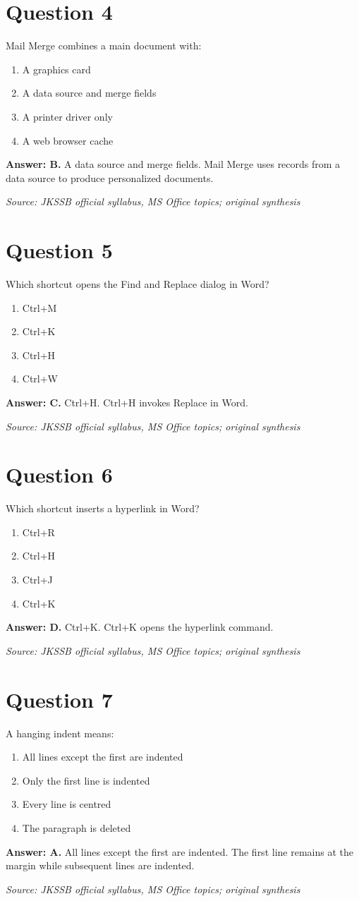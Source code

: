 \documentclass[11pt,a4paper]{book}
\newcommand{\source}[1]{\par\smallskip\textit{Source: #1}}
\newcommand{\answer}[2]{\par\textbf{Answer: #1.} #2}
\begin{document}
\section*{Question 4}
Mail Merge combines a main document with:
\begin{enumerate}[label=\Alph*.]
\item A graphics card
\item A data source and merge fields
\item A printer driver only
\item A web browser cache
\end{enumerate}
\answer{B}{A data source and merge fields. Mail Merge uses records from a data source to produce personalized documents.}
\source{JKSSB official syllabus, MS Office topics; original synthesis}
\section*{Question 5}
Which shortcut opens the Find and Replace dialog in Word?
\begin{enumerate}[label=\Alph*.]
\item Ctrl+M
\item Ctrl+K
\item Ctrl+H
\item Ctrl+W
\end{enumerate}
\answer{C}{Ctrl+H. Ctrl+H invokes Replace in Word.}
\source{JKSSB official syllabus, MS Office topics; original synthesis}
\section*{Question 6}
Which shortcut inserts a hyperlink in Word?
\begin{enumerate}[label=\Alph*.]
\item Ctrl+R
\item Ctrl+H
\item Ctrl+J
\item Ctrl+K
\end{enumerate}
\answer{D}{Ctrl+K. Ctrl+K opens the hyperlink command.}
\source{JKSSB official syllabus, MS Office topics; original synthesis}
\section*{Question 7}
A hanging indent means:
\begin{enumerate}[label=\Alph*.]
\item All lines except the first are indented
\item Only the first line is indented
\item Every line is centred
\item The paragraph is deleted
\end{enumerate}
\answer{A}{All lines except the first are indented. The first line remains at the margin while subsequent lines are indented.}
\source{JKSSB official syllabus, MS Office topics; original synthesis}
\end{document}
